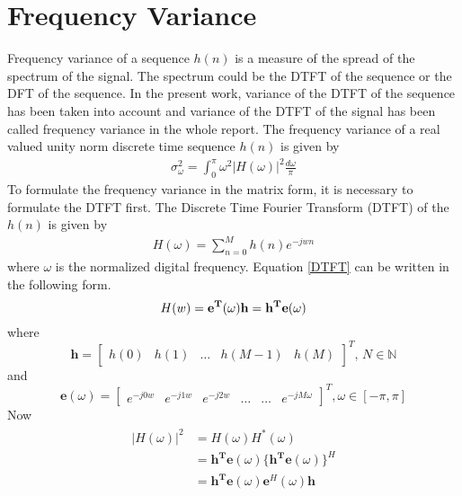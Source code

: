 \section{Frequency Variance}
\label{sec: freq. var.}
Frequency variance of a sequence $h(n)$ is a measure of the spread of the spectrum of the signal. The spectrum could be the DTFT of the sequence or the DFT of the sequence. In the present work, variance of the DTFT of the sequence has been taken into account and variance of the DTFT of the signal has been called frequency variance in the whole report. The frequency variance of a real valued unity norm discrete time sequence $h(n)$ is given by
\begin{eqnarray}
\sigma_{\omega}^{2}=\int_{0}^{\pi}\omega^{2}|H(\omega)|^{2}\frac{d\omega}{\pi}\label{eq:Frequency variance}
\end{eqnarray}
To formulate the frequency variance in the matrix form, it is necessary to formulate the DTFT first. The Discrete Time Fourier Transform (DTFT) of the $h(n)$ is given by
\begin{eqnarray}
\label{DTFT}
H(\omega) = \sum_{n=0}^{M} h(n) e^{-jwn}
\end{eqnarray}
where $\omega$ is the normalized digital frequency. Equation \ref{DTFT} can be written in the following form.
\begin{equation}
H(w)=\mathbf{e^T}(\omega)\mathbf{h}  \\ = \mathbf{h^{T}e}(\omega)   
\end{equation}
where 
\begin{equation}
\label{eq:FilterVector}
\mathbf{h}=\left[\begin{array}{ccccc}
h(0) & h(1) & \ldots & h(M-1) & h(M)\end{array}\right]^{T},\, N\in\mathbb{N}
\end{equation}
and
\begin{equation}
\label{eq:Evector}
\mathbf{e}(\omega)=\left[\begin{array}{cccccc}
e^{-j0w} & e^{-j1w} & e^{-j2w} & \ldots & \ldots & e^{-jM\omega}\end{array}\right]^{T},\omega\in[-\pi,\pi]
\end{equation}
Now
\begin{eqnarray}
\label{eq: H(w) sq}
\begin{aligned}
|H(\omega)|^2 &= H(\omega)H^*(\omega)\\
&= \mathbf{h^{T}e}(\omega) \{ \mathbf{h^{T}e}(\omega) \}^{H}\\
&= \mathbf{h^{T}e}(\omega) \mathbf{e}^{H}(\omega) \mathbf{h}\\
\end{aligned}
\end{eqnarray}
